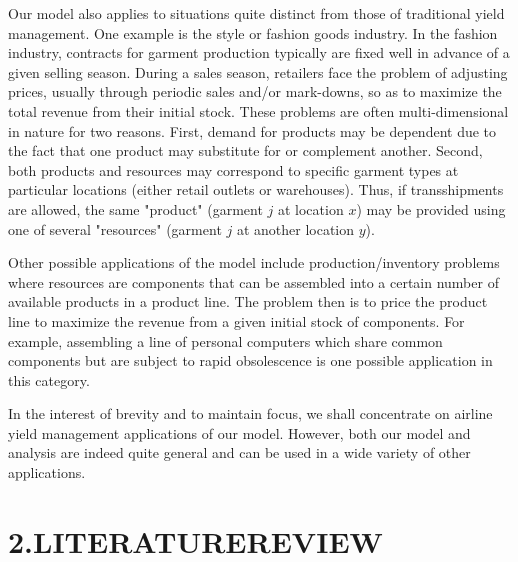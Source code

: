 Our model also applies to situations quite distinct from those of traditional yield management. One example is the style or fashion goods industry. In the fashion industry, contracts for garment production typically are fixed well in advance of a given selling season. During a sales season, retailers face the problem of adjusting prices, usually through periodic sales and/or mark-downs, so as to maximize the total revenue from their initial stock. These problems are often multi-dimensional in nature for two reasons. First, demand for products may be dependent due to the fact that one product may substitute for or complement another. Second, both products and resources may correspond to specific garment types at particular locations (either retail outlets or warehouses). Thus, if transshipments are allowed, the same "product" (garment \(j\) at location \(x\)) may be provided using one of several "resources" (garment \(j\) at another location \(y\)).

Other possible applications of the model include production/inventory problems where resources are components that can be assembled into a certain number of available products in a product line. The problem then is to price the product line to maximize the revenue from a given initial stock of components. For example, assembling a line of personal computers which share common components but are subject to rapid obsolescence is one possible application in this category.

In the interest of brevity and to maintain focus, we shall concentrate on airline yield management applications of our model. However, both our model and analysis are indeed quite general and can be used in a wide variety of other applications.

\section{2.LITERATUREREVIEW}\label{literaturereview}

